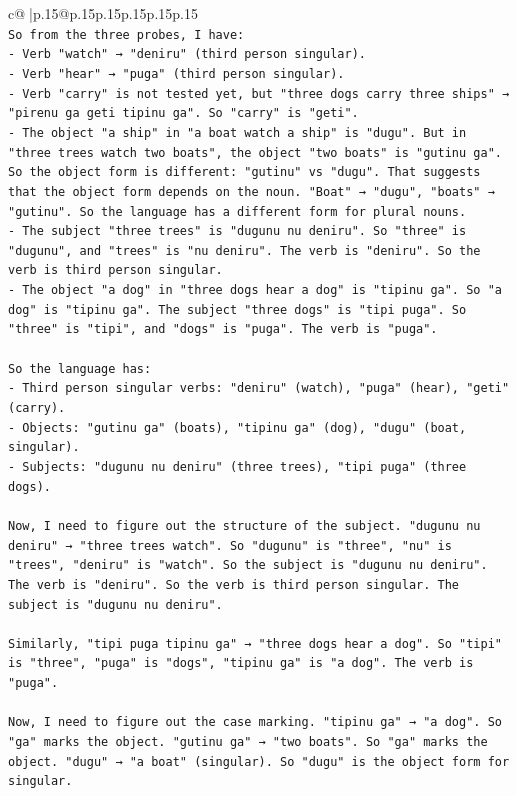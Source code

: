 \documentclass{article}
\begin{document}
{\begin{supertabular}{c@{$\;$}|p{.15\linewidth}@{}p{.15\linewidth}p{.15\linewidth}p{.15\linewidth}p{.15\linewidth}p{.15\linewidth}}
{{{\\ 
\texttt{So from the three probes, I have:} \\
\texttt{{-} Verb "watch" → "deniru" (third person singular).} \\
\texttt{{-} Verb "hear" → "puga" (third person singular).} \\
\texttt{{-} Verb "carry" is not tested yet, but "three dogs carry three ships" → "pirenu ga geti tipinu ga". So "carry" is "geti".} \\
\texttt{{-} The object "a ship" in "a boat watch a ship" is "dugu". But in "three trees watch two boats", the object "two boats" is "gutinu ga". So the object form is different: "gutinu" vs "dugu". That suggests that the object form depends on the noun. "Boat" → "dugu", "boats" → "gutinu". So the language has a different form for plural nouns.} \\
\texttt{{-} The subject "three trees" is "dugunu nu deniru". So "three" is "dugunu", and "trees" is "nu deniru". The verb is "deniru". So the verb is third person singular.} \\
\texttt{{-} The object "a dog" in "three dogs hear a dog" is "tipinu ga". So "a dog" is "tipinu ga". The subject "three dogs" is "tipi puga". So "three" is "tipi", and "dogs" is "puga". The verb is "puga".} \\
\\ 
\texttt{So the language has:} \\
\texttt{{-} Third person singular verbs: "deniru" (watch), "puga" (hear), "geti" (carry).} \\
\texttt{{-} Objects: "gutinu ga" (boats), "tipinu ga" (dog), "dugu" (boat, singular).} \\
\texttt{{-} Subjects: "dugunu nu deniru" (three trees), "tipi puga" (three dogs).} \\
\\ 
\texttt{Now, I need to figure out the structure of the subject. "dugunu nu deniru" → "three trees watch". So "dugunu" is "three", "nu" is "trees", "deniru" is "watch". So the subject is "dugunu nu deniru". The verb is "deniru". So the verb is third person singular. The subject is "dugunu nu deniru".} \\
\\ 
\texttt{Similarly, "tipi puga tipinu ga" → "three dogs hear a dog". So "tipi" is "three", "puga" is "dogs", "tipinu ga" is "a dog". The verb is "puga".} \\
\\ 
\texttt{Now, I need to figure out the case marking. "tipinu ga" → "a dog". So "ga" marks the object. "gutinu ga" → "two boats". So "ga" marks the object. "dugu" → "a boat" (singular). So "dugu" is the object form for singular.} \\
}}}
\end{supertabular}}
\end{document}
